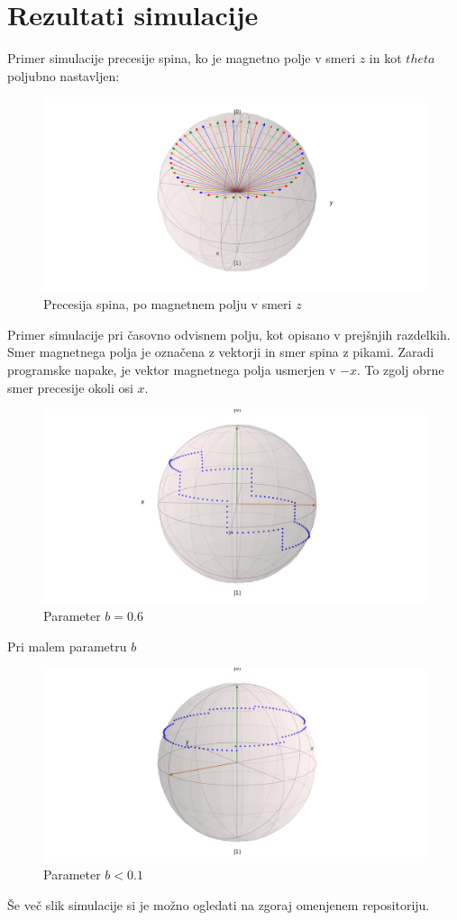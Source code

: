 \documentclass[12pt, a4paper]{article}
\begin{document}
\section{Rezultati simulacije}
Primer simulacije precesije spina, ko je magnetno polje v smeri $z$ in kot $theta$ poljubno nastavljen:
\begin{figure}[H]
  \includegraphics[width=350pt]{slike/precesija_po_osi_z.png}
  \caption{Precesija spina, po magnetnem polju v smeri $z$}
  \label{fig:boat1}
\end{figure}
Primer simulacije pri časovno odvisnem polju, kot opisano v prejšnjih razdelkih. Smer magnetnega polja je označena z vektorji in smer spina z pikami. Zaradi programske napake, je vektor magnetnega polja usmerjen v $-x$. To zgolj obrne smer precesije okoli osi $x$.
\begin{figure}[H]
	\includegraphics[width=350pt]{slike/b=06.png}
	\caption{Parameter $b = 0.6$ }
	\label{fig:boat1}
\end{figure}
Pri malem parametru $b$
\begin{figure}[H]
	\includegraphics[width=400pt]{slike/precesija_v_cas}
	\caption{Parameter $b < 0.1$ }
	\label{fig:boat1}
  \end{figure}
Še več slik simulacije si je možno ogledati na zgoraj omenjenem repositoriju.
\end{document}
